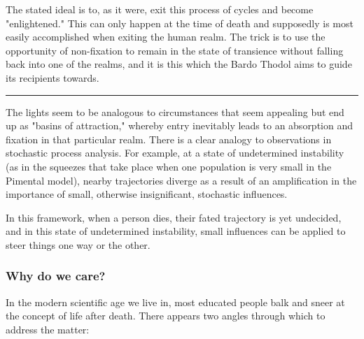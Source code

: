 The stated ideal is to, as it were, exit this process of cycles and become "enlightened." This can only happen at the time of death and supposedly is most easily accomplished when exiting the human realm. The trick is to use the opportunity of non-fixation to remain in the state of transience without falling back into one of the realms, and it is this which the Bardo Thodol aims to guide its recipients towards.

\vspace{5pt} \hrule \vspace{5pt}

The lights seem to be analogous to circumstances that seem appealing but end up as "basins of attraction," whereby entry inevitably leads to an absorption and fixation in that particular realm. There is a clear analogy to observations in stochastic process analysis. For example, at a state of undetermined instability (as in the squeezes that take place when one population is very small in the Pimental model), nearby trajectories diverge as a result of an amplification in the importance of small, otherwise insignificant, stochastic influences.

In this framework, when a person dies, their fated trajectory is yet undecided, and in this state of undetermined instability, small influences can be applied to steer things one way or the other.

\subsubsection*{Why do we care?} In the modern scientific age we live in, most educated people balk and sneer at the concept of life after death.  There appears two angles through which to address the matter:

